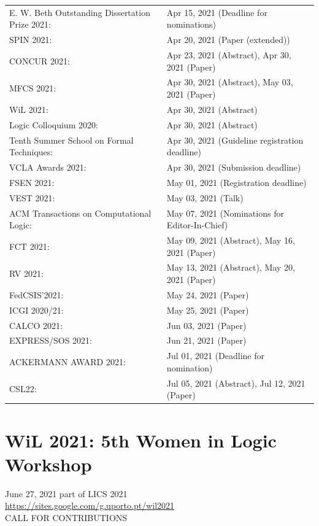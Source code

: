 \documentclass[prodmode,acmtecs]{acmsmall} %
\begin{document}
\begin{tabulary}{\linewidth}{LL}
E. W. Beth Outstanding Dissertation Prize 2021:  & Apr 15, 2021 (Deadline for nominations) \\
SPIN 2021:  & Apr 20, 2021 (Paper (extended)) \\
CONCUR 2021:  & Apr 23, 2021 (Abstract), Apr 30, 2021 (Paper) \\
MFCS 2021:  & Apr 30, 2021 (Abstract), May 03, 2021 (Paper) \\
WiL 2021:  & Apr 30, 2021 (Abstract) \\
Logic Colloquium 2020:  & Apr 30, 2021 (Abstract) \\
Tenth Summer School on Formal Techniques:  & Apr 30, 2021 (Guideline registration deadline) \\
VCLA Awards 2021:  & Apr 30, 2021 (Submission deadline) \\
FSEN 2021:  & May 01, 2021 (Registration deadline) \\
VEST 2021:  & May 03, 2021 (Talk) \\
ACM Transactions on Computational Logic:  & May 07, 2021 (Nominations for Editor-In-Chief) \\
FCT 2021:  & May 09, 2021 (Abstract), May 16, 2021 (Paper) \\
RV 2021:  & May 13, 2021 (Abstract), May 20, 2021 (Paper) \\
FedCSIS’2021:  & May 24, 2021 (Paper) \\
ICGI 2020/21:  & May 25, 2021 (Paper) \\
CALCO 2021:  & Jun 03, 2021 (Paper) \\
EXPRESS/SOS 2021:  & Jun 21, 2021 (Paper) \\
ACKERMANN AWARD 2021:  & Jul 01, 2021 (Deadline for nomination) \\
CSL22:  & Jul 05, 2021 (Abstract), Jul 12, 2021 (Paper) \\
\end{tabulary}
\section{WiL 2021: 5th Women in Logic Workshop}\label{WiL2021}  June 27, 2021 part of LICS 2021\\ 
  \href{https://sites.google.com/g.uporto.pt/wil2021}{https://sites.google.com/g.uporto.pt/wil2021}\\ 
CALL FOR CONTRIBUTIONS 
\end{document}

